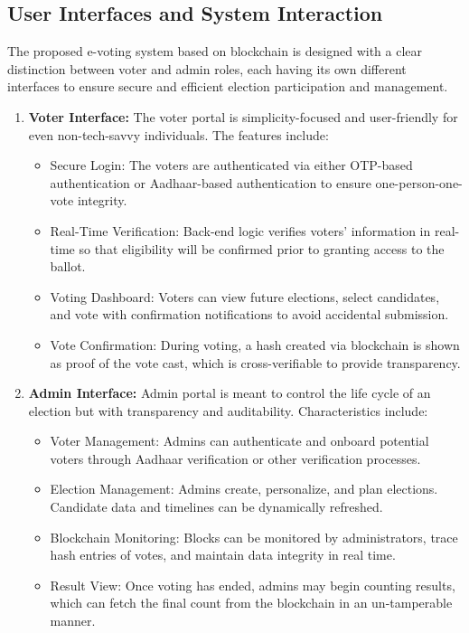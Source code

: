 \documentclass[conference]{IEEEtran}
\begin{document}
\subsection{User Interfaces and System Interaction}

The proposed e-voting system based on blockchain is designed with a clear distinction between voter and admin roles, each having its own different interfaces to ensure secure and efficient election participation and management.

\begin{enumerate}
    \item \textbf{Voter Interface:} 
    The voter portal is simplicity-focused and user-friendly for even non-tech-savvy individuals. The features include:
    \begin{itemize}
        \item {Secure Login:} The voters are authenticated via either OTP-based authentication or Aadhaar-based authentication to ensure one-person-one-vote integrity.
\item {Real-Time Verification:} Back-end logic verifies voters' information in real-time so that eligibility will be confirmed prior to granting access to the ballot.
\item {Voting Dashboard:} Voters can view future elections, select candidates, and vote with confirmation notifications to avoid accidental submission.
\item {Vote Confirmation:} During voting, a hash created via blockchain is shown as proof of the vote cast, which is cross-verifiable to provide transparency.
    \end{itemize}
    
    \item \textbf{Admin Interface:}
Admin portal is meant to control the life cycle of an election but with transparency and auditability. Characteristics include:
\begin{itemize}
\item {Voter Management:} Admins can authenticate and onboard potential voters through Aadhaar verification or other verification processes.
\item {Election Management:} Admins create, personalize, and plan elections. Candidate data and timelines can be dynamically refreshed.
\item {Blockchain Monitoring:} Blocks can be monitored by administrators, trace hash entries of votes, and maintain data integrity in real time.
\item {Result View:} Once voting has ended, admins may begin counting results, which can fetch the final count from the blockchain in an un-tamperable manner.
    \end{itemize}
\end{enumerate}
\end{document}
